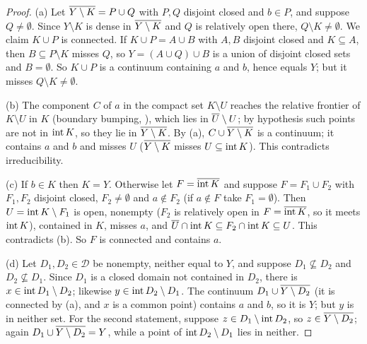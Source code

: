 \begin{proof}
(a) Let $\overline{Y\setminus K}=P\cup Q$ with $P,Q$ disjoint closed and $b\in P$, and suppose $Q\ne\emptyset$. Since $Y\setminus K$
is dense in $\overline{Y\setminus K}$ and $Q$ is relatively open there, $Q\setminus K\ne\emptyset$. We claim $K\cup P$ is connected. If
$K\cup P=A\cup B$ with $A,B$ disjoint closed and $K\subseteq A$, then $B\subseteq P\setminus K$ misses $Q$, so $Y=(A\cup Q)\cup B$ is a
union of disjoint closed sets and $B=\emptyset$. So $K\cup P$ is a continuum containing $a$ and $b$, hence equals $Y$; but
it misses $Q\setminus K\neq\emptyset$.

(b) The component $C$ of $a$ in the compact set $K\setminus U$ reaches the relative frontier of $K\setminus U$ in $K$
(boundary bumping, ), which lies in $\overline{U}\setminus U$; by hypothesis such points are not in
$\operatorname{int} K$, so they lie in $\overline{Y\setminus K}$. By (a), $C\cup\overline{Y\setminus K}$ is a continuum; it contains $a$ and $b$ and
misses $U$ ($\overline{Y\setminus K}$ misses $U\subseteq\operatorname{int} K$). This contradicts irreducibility.

(c) If $b\in K$ then $K=Y$. Otherwise let $F=\overline{\operatorname{int} K}$ and suppose $F=F_1\cup F_2$ with $F_1,F_2$ disjoint
closed, $F_2\ne\emptyset$ and $a\notin F_2$ (if $a\notin F$ take $F_1=\emptyset$). Then $U=\operatorname{int} K\setminus F_1$ is open,
nonempty ($F_2$ is relatively open in $F=\overline{\operatorname{int} K}$, so it meets $\operatorname{int} K$), contained in $K$, misses $a$,
and $\overline{U}\cap\operatorname{int} K\subseteq F_2\cap\operatorname{int} K\subseteq U$. This contradicts (b). So $F$ is connected and contains
$a$.

(d) Let $D_1,D_2\in\mathcal D$ be nonempty, neither equal to $Y$, and suppose $D_1\not\subseteq D_2$ and $D_2\not\subseteq D_1$.
Since $D_1$ is a closed domain not contained in $D_2$, there is $x\in\operatorname{int} D_1\setminus D_2$; likewise $y\in\operatorname{int}
D_2\setminus D_1$. The continuum $D_1\cup\overline{Y\setminus D_2}$ (it is connected by (a), and $x$ is a common point) contains
$a$ and $b$, so it is $Y$; but $y$ is in neither set. For the second statement, suppose $z\in D_1\setminus\operatorname{int}
D_2$, so $z\in\overline{Y\setminus D_2}$; again $D_1\cup\overline{Y\setminus D_2}=Y$, while a point of $\operatorname{int} D_2\setminus D_1$ lies in
neither.
\end{proof}


